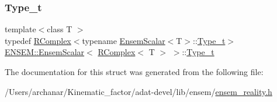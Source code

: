 \subsubsection{\texorpdfstring{Type\_t}{Type\_t}\hspace{0.1cm}{\footnotesize\ttfamily [3/3]}}
{\footnotesize\ttfamily template$<$class T $>$ \\
typedef \mbox{\hyperlink{classENSEM_1_1RComplex}{R\+Complex}}$<$typename \mbox{\hyperlink{structENSEM_1_1EnsemScalar}{Ensem\+Scalar}}$<$T$>$\+::\mbox{\hyperlink{structENSEM_1_1EnsemScalar_3_01RComplex_3_01T_01_4_01_4_abd854cbfbb45aac23836c31aa0a35076}{Type\+\_\+t}}$>$ \mbox{\hyperlink{structENSEM_1_1EnsemScalar}{E\+N\+S\+E\+M\+::\+Ensem\+Scalar}}$<$ \mbox{\hyperlink{classENSEM_1_1RComplex}{R\+Complex}}$<$ T $>$ $>$\+::\mbox{\hyperlink{structENSEM_1_1EnsemScalar_3_01RComplex_3_01T_01_4_01_4_abd854cbfbb45aac23836c31aa0a35076}{Type\+\_\+t}}}



The documentation for this struct was generated from the following file\+:\begin{DoxyCompactItemize}
\item 
/\+Users/archanar/\+Kinematic\+\_\+factor/adat-\/devel/lib/ensem/\mbox{\hyperlink{adat-devel_2lib_2ensem_2ensem__reality_8h}{ensem\+\_\+reality.\+h}}\end{DoxyCompactItemize}
